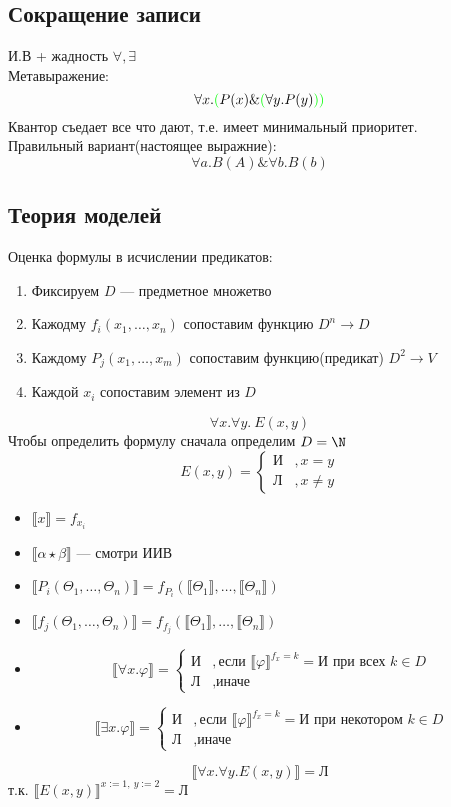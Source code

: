 \documentclass[oneside]{book}
\begin{document}
\subsection{Сокращение записи}
\label{sec:orgbe7e3b2}
И.В + жадность \(\forall, \exists\) \\
Метавыражение:
\[ \forall x. \color{green}(\color{black}P(x) \& \color{green}(\color{black}\forall y. P(y) \color{green}))\color{black} \]
Квантор съедает все что дают, т.е. имеет минимальный приоритет. \\
Правильный вариант(настоящее выражние):
\[ \forall a. B(A) \& \forall b. B(b) \]
\subsection{Теория моделей}
\label{sec:org658b318}
Оценка формулы в исчислении предикатов:
\begin{enumerate}
	\item Фиксируем \(D\) --- предметное множетво
	\item Кажодму \(f_i(x_1, \dots, x_n)\) сопоставим функцию \(D^n \to D\)
	\item Каждому \(P_j(x_1, \dots, x_m)\) сопоставим функцию(предикат) \(D^2 \to V\)
	\item Каждой \(x_i\) сопоставим элемент из \(D\)
\end{enumerate}
\begin{examp}
	\[\forall x.\forall y.\ E(x, y)\]
	Чтобы определить формулу сначала определим \(D = \N\)
	\[ E(x, y) = \begin{cases}\text{И} & ,x = y \\ \text{Л} &, x\neq y\end{cases} \]
	\begin{itemize}
		\item \(\llbracket x \rrbracket = f_{x_i}\)
		\item \(\llbracket \alpha \star \beta \rrbracket\) --- смотри ИИВ
		\item \(\llbracket P_i(\Theta_1, \dots , \Theta_n) \rrbracket = f_{P_i}(\llbracket \Theta_1 \rrbracket, \dots, \llbracket \Theta_n \rrbracket)\)
		\item \(\llbracket f_j(\Theta_1 , \dots, \Theta_n ) \rrbracket = f_{f_j}(\llbracket \Theta_1 \rrbracket, \dots, \llbracket \Theta_n \rrbracket)\)
		\item \[ \llbracket \forall x. \varphi \rrbracket = \begin{cases} \text{И} & , \text{если } \llbracket \varphi \rrbracket^{f_x = k} = \text{И}\text{ при всех } k \in D  \\ \text{Л} &,\text{иначе}\end{cases} \]
		\item \[ \llbracket \exists x.\varphi \rrbracket = \begin{cases} \text{И} &, \text{если } \llbracket \varphi \rrbracket^{f_x = k} = \text{И при некотором } k \in D \\ \text{Л} &,\text{иначе} \end{cases} \]
	\end{itemize}
	\[ \llbracket \forall x.\forall y.E(x, y) \rrbracket = \text{Л} \]
	т.к. \(\llbracket E(x, y) \rrbracket^{x:=1,\ y:=2} = \text{Л}\)
\end{examp}
\end{document}
